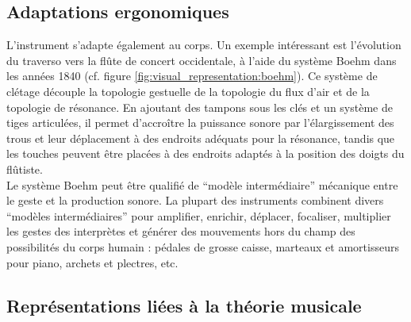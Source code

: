 \subsection{Adaptations ergonomiques}


\noindent L'instrument s'adapte également au corps. Un exemple intéressant est l'évolution du traverso vers la flûte de concert occidentale, à l'aide du système Boehm dans les années 1840 (cf. figure \ref{fig:visual_representation:boehm}). Ce système de clétage découple la topologie gestuelle de la topologie du flux d'air et de la topologie de résonance. En ajoutant des tampons sous les clés et un système de tiges articulées, il permet d'accroître la puissance sonore par l'élargissement des trous et leur déplacement à des endroits adéquats pour la résonance, tandis que les touches peuvent être placées à des endroits adaptés à la position des doigts du flûtiste.\\
\indent Le système Boehm peut être qualifié de ``modèle intermédiaire'' mécanique entre le geste et la production sonore. La plupart des instruments combinent divers ``modèles intermédiaires'' pour amplifier, enrichir, déplacer, focaliser, multiplier les gestes des interprètes et générer des mouvements hors du champ des possibilités du corps humain : pédales de grosse caisse, marteaux et amortisseurs pour piano, archets et plectres, etc.

\subsection{Représentations liées à la théorie musicale}
\label{ch:visual_representation:music-theory}

